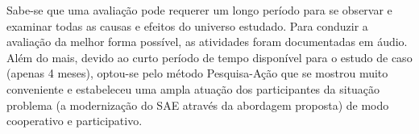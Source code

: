 Sabe-se que uma avaliação pode requerer um longo período
para se observar e examinar todas as causas e efeitos do universo
estudado. Para conduzir a avaliação da melhor forma possível, as
atividades foram documentadas em áudio. Além do mais,
devido ao curto período de tempo disponível para o estudo de
caso (apenas 4 meses), optou-se pelo método Pesquisa-Ação que se
mostrou muito conveniente e estabeleceu uma ampla atuação dos
participantes da situação problema (a modernização do \acrshort{SAE}
através da abordagem proposta) de modo cooperativo e participativo. 








